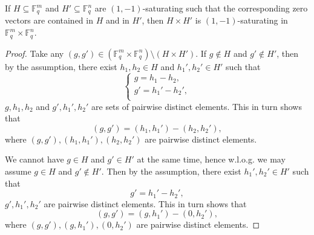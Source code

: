 \documentclass[10pt,a4paper]{amsart}
\newcommand{\F}{{\mathbb F}}
\begin{document}
	\begin{proposition}
		If $H \subseteq \F_q^m$ and $H' \subseteq \F_q^n$ are $(1,-1)$-saturating such that the corresponding zero vectors are contained in $H$ and in $H'$, then $H \times H'$ is $(1,-1)$-saturating in $\F_q^m \times \F_q^n$.  
	\end{proposition}

	\begin{proof}
		Take any $(g,g') \in (\F_q^{m}\times \F_q^{n}) \setminus (H \times H')$. If $g\notin H$ and $g'\notin H'$, then by the assumption, there exist $h_1,h_2 \in H$ and $h_1',h_2' \in H'$ such that
		\begin{equation*}   
			\begin{cases}
				g=h_1-h_2,\\
				g'=h_1'-h_2',\\
			\end{cases}
		\end{equation*}
		$g,h_1,h_2$ and $g',h_1',h_2'$ are sets of pairwise distinct elements.
		This in turn shows that $$(g,g')=(h_1, h_1')-(h_2, h_2'),$$
		where $(g,g'),(h_1,h_1'),(h_2,h_2')$ are pairwise distinct elements. 
		
		We cannot have $g\in H$ and $g'\in H'$ at the same time, hence w.l.o.g. we may assume $g\in H$ and $g'\notin H'$. 
		Then by the assumption, there exist $h_1',h_2' \in H'$ such that
		\[g'=h_1'-h_2',\]
		$g', h_1', h_2'$ are pairwise distinct elements.
		This in turn shows that $$(g,g')=(g, h_1')-(0, h_2'),$$
		where $(g,g'),(g,h_1'),(0,h_2')$ are pairwise distinct elements. 
	\end{proof}
\end{document}
